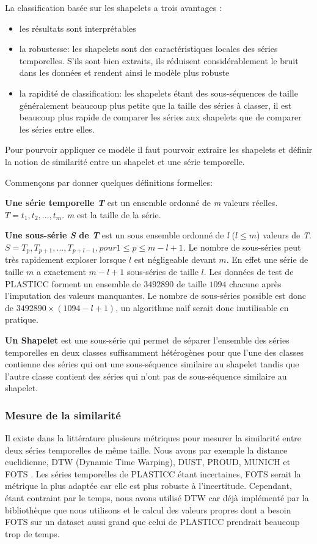 La classification basée sur les shapelets a trois avantages \citep{ye2009time}:
\begin{itemize}
    \item les résultats sont interprétables 
    \item la robustesse: les shapelets sont des caractéristiques locales des séries temporelles. S'ils sont bien extraits, ils réduisent considérablement le bruit dans les données et rendent ainsi le modèle plus robuste
    \item la rapidité de classification: les shapelets étant des sous-séquences de taille généralement beaucoup plus petite que la taille des séries à classer, il est beaucoup plus rapide de comparer les séries aux shapelets que de comparer les séries entre elles.
\end{itemize}

Pour pourvoir appliquer ce modèle il faut pourvoir extraire les shapelets et définir la notion de similarité entre un shapelet et une série temporelle.

Commençons par donner quelques définitions formelles:

\textbf{Une série temporelle \textit{T}} est un ensemble ordonné de \textit{m} valeurs réelles. $ T = t_1, t_2,...,t_m $. \textit{m} est la taille de la série.

\textbf{Une sous-série \textit{S} de \textit{T}} est un sous ensemble ordonné de \textit{l} ($ l \leq m $) valeurs de \textit{T}. $ S = T_p, T_{p+1},..., T_{p+l-1}, pour 1 \leq p \leq m-l+1 $. Le nombre de sous-séries peut très rapidement exploser lorsque $l$ est négligeable devant $m$. En effet une série de taille $m$ a exactement $ m-l+1 $ sous-séries de taille $l$. Les données de test de PLASTICC forment un ensemble de $ 3492890 $ de taille $1094$ chacune après l'imputation des valeurs manquantes. Le nombre de sous-séries possible est donc de $ 3492890 \times (1094 - l + 1)$, un algorithme naïf serait donc inutilisable en pratique.

\textbf{Un Shapelet} est une sous-série qui permet de séparer l'ensemble des séries temporelles en deux classes suffisamment hétérogènes pour que l'une des classes contienne des séries qui ont une sous-séquence similaire au shapelet tandis que l'autre classe contient des séries qui n'ont pas de sous-séquence similaire au shapelet\cite{fotso2018frobenius}. 

\subsubsection{Mesure de la similarité}
Il existe dans la littérature plusieurs métriques pour mesurer la similarité entre deux séries temporelles de même taille. Nous avons par exemple la distance euclidienne, DTW (Dynamic Time Warping), DUST, PROUD, MUNICH et FOTS \cite{fotso2018frobenius}. Les séries temporelles de PLASTICC étant incertaines, FOTS serait la métrique la plus adaptée car elle est plus robuste à l'incertitude. Cependant, étant contraint par le temps, nous avons utilisé DTW car déjà implémenté par la bibliothèque que nous utilisons et le calcul des valeurs propres dont a besoin FOTS sur un dataset aussi grand que celui de PLASTICC prendrait beaucoup trop de temps.

